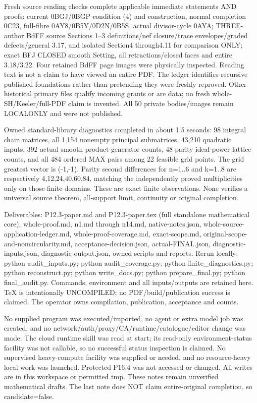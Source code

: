 \documentclass[11pt]{article}
\begin{document}
Fresh source reading checks complete applicable immediate statements AND proofs: current 0BGJ/0BGP condition (4) and construction, normal completion 0C23, full-fibre 0AY8/0B5Y/0D2N/0B5S, actual divisor-cycle 0AYA; THREE-author BdFF source Sections 1--3 definitions/nef closure/trace envelopes/graded defects/general 3.17, and isolated Section4 through4.11 for comparison ONLY; exact BFJ CLOSED smooth Setting, all retractions/closed faces and entire 3.18/3.22. Four retained BdFF page images were physically inspected. Reading text is not a claim to have viewed an entire PDF. The ledger identifies recursive published foundations rather than pretending they were freshly reproved. Other historical primary files qualify incoming grants or are data; no fresh whole-SH/Keeler/full-PDF claim is invented. All 50 private bodies/images remain LOCALONLY and were not published.

Owned standard-library diagnostics completed in about 1.5 seconds: 98 integral chain matrices, all 1,154 nonempty principal submatrices, 43,210 quadratic inputs, 392 actual smooth product-generator counts, 48 parity ideal-power lattice counts, and all 484 ordered MAX pairs among 22 feasible grid points. The grid greatest vector is (-1,-1). Parity second differences for n=1..6 and k=1..8 are respectively 4,12,24,40,60,84, matching the independently proved multiplicities only on those finite domains. These are exact finite observations. None verifies a universal source theorem, all-support limit, continuity or original completion.

Deliverables: P12.3-paper.md and P12.3-paper.tex (full standalone mathematical core), whole-proof.md, n1.md through n14.md, native-notes.json, whole-source-application-ledger.md, whole-proof-coverage.md, exact-scope.md, original-scope-and-noncircularity.md, acceptance-decision.json, actual-FINAL.json, diagnostic-inputs.json, diagnostic-output.json, owned scripts and reports. Rerun locally: python audit\_inputs.py; python audit\_coverage.py; python finite\_diagnostics.py; python reconstruct.py; python write\_docs.py; python prepare\_final.py; python final\_audit.py. Commands, environment and all inputs/outputs are retained here. TeX is intentionally UNCOMPILED; no PDF/build/publication success is claimed. The operator owns compilation, publication, acceptance and counts.

No supplied program was executed/imported, no agent or extra model job was created, and no network/auth/proxy/CA/runtime/catalogue/editor change was made. The cloud runtime skill was read at start; its read-only environment-status facility was not callable, so no successful status inspection is claimed. No supervised heavy-compute facility was supplied or needed, and no resource-heavy local work was launched. Protected P16.4 was not accessed or changed. All writes are in this workspace or permitted tmp. These notes remain unverified mathematical drafts. The last note does NOT claim entire-original completion, so candidate=false.
\end{document}
